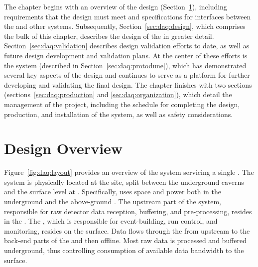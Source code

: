 The chapter begins with an overview of the  design
(Section~\ref{sec:daq:overview}), including requirements that the design
must meet and specifications for interfaces between the   and other
  systems.  Subsequently,
Section~\ref{sec:daq:design}, which comprises the bulk of this chapter,
describes the design of the   in greater detail.
Section~\ref{sec:daq:validation} describes design validation efforts to
date, as well as future design development and validation plans. At the center of
these efforts is the    system (described in
Section~\ref{sec:daq:protodune}), which has demonstrated
several key aspects of the      design and continues
to serve as a platform for further developing and validating 
the final design.  The chapter finishes with two sections
(sections~\ref{sec:daq:production} and \ref{sec:daq:organization}), which
detail the management of the  project, including the
schedule for completing the design,  production, and installation of the
system, as well as safety considerations.

\section{Design Overview}
\label{sec:daq:overview}

Figure~\ref{fig:daq:layout} provides an overview of the    system 
servicing a single 
. The system is
physically located at the  site, split between the
underground  caverns and the surface level at . Specifically,  uses space and
power both in the underground  and the above-ground .
The upstream part of the system, responsible for
raw detector data reception, buffering, and pre-processing, resides in the .
The ,
which is responsible for
event-building, run control, and monitoring, resides on the
surface.
Data flows through the  from 
upstream to the back-end parts of the  and then offline. Most raw data is processed and buffered underground, 
thus controlling consumption of available data bandwidth  to the surface. 

